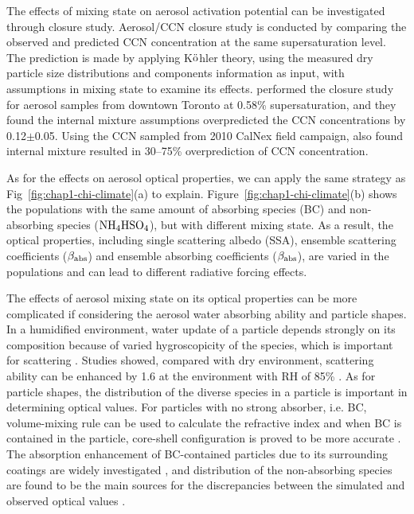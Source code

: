 \documentclass[edeposit,fullpage]{uiucthesis2009}
\begin{document}
The effects of mixing state on aerosol activation potential can be investigated through closure study. Aerosol/CCN closure study is conducted by comparing the observed and predicted CCN concentration at the same supersaturation level. The prediction is made by applying K$\ddot{\rm o}$hler theory, using the measured dry particle size distributions and components information as input, with assumptions in mixing state to examine its effects.  \citet{broekhuizen2006closure} performed the closure study for aerosol samples from downtown Toronto at 0.58\% supersaturation, and they found the internal mixture assumptions overpredicted the CCN concentrations by 0.12$\pm$0.05. Using the CCN sampled from 2010 CalNex field campaign, \citet{moore2012hygroscopicity} also found internal mixture resulted in 30--75\% overprediction of CCN concentration. 

As for the effects on aerosol optical properties, we can apply the same strategy as Fig~\ref{fig:chap1-chi-climate}(a) to explain. Figure~\ref{fig:chap1-chi-climate}(b) shows the populations with the same amount of absorbing species (BC) and non-absorbing species ($\rm NH_4HSO_4$), but with different mixing state. As a result, the optical properties, including single scattering albedo (SSA), ensemble scattering coefficients ($\beta_{\rm abs}$) and ensemble absorbing coefficients ($\beta_{\rm abs}$), are varied in the populations and can lead to different radiative forcing effects.

The effects of aerosol mixing state on its optical properties can be more complicated if considering the aerosol water absorbing ability and particle shapes. In a humidified environment, water update of a particle depends strongly on its composition because of varied hygroscopicity of the species, which is important for scattering \citep{MichelFlores2012, Zieger2013, Titos2014, Titos2016}. Studies showed, compared with dry environment, scattering ability can be enhanced by 1.6 at the environment with RH of 85\% \citep{Burgos2020}. As for particle shapes, the distribution of the diverse species in a particle is important in determining optical values. For particles with no strong absorber, i.e. BC, volume-mixing rule can be used to calculate the refractive index and when BC is contained in the particle, core-shell configuration is proved to be more accurate \citep{Bond2006}. The absorption enhancement of BC-contained particles due to its surrounding coatings are widely investigated \citep{Moffet2009,Liu2017, wu2020light}, and distribution of the non-absorbing species are found to be the main sources for the discrepancies between the simulated and observed optical values \citep{Fierce2016, Fierce2020}.
\end{document}
